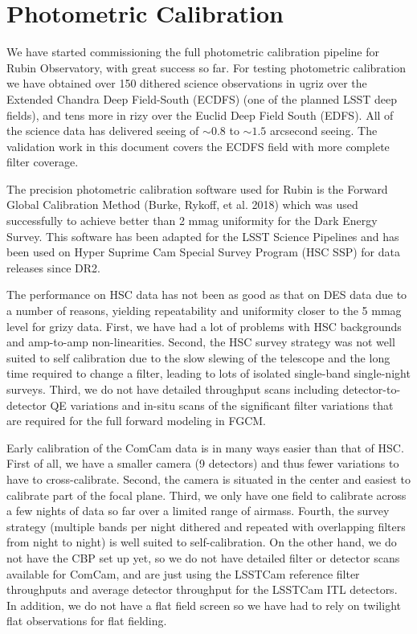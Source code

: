 \section{Photometric Calibration}
\label{sec:photometric_calibration}

We have started commissioning the full photometric calibration pipeline for
Rubin Observatory, with great success so far. For testing photometric
calibration we have obtained over 150 dithered science observations in ugriz
over the Extended Chandra Deep Field-South (ECDFS) (one of the planned LSST
deep fields), and tens more in rizy over the Euclid Deep Field South
(EDFS). All of the science data has delivered seeing of $\sim0.8$ to $\sim1.5$
arcsecond seeing.  The
validation work in this document covers the ECDFS field with more complete
filter coverage.

The precision photometric calibration software used for Rubin is the Forward
Global Calibration Method (Burke, Rykoff, et al. 2018) which was used
successfully to achieve better than 2 mmag uniformity for the Dark Energy
Survey. This software has been adapted for the LSST Science Pipelines and has
been used on Hyper Suprime Cam Special Survey Program (HSC SSP) for data
releases since DR2.

The performance on HSC data has not been as good as that on DES data due to a
number of reasons, yielding repeatability and uniformity closer to the 5 mmag
level for grizy data.  First, we have had a lot of problems with HSC
backgrounds and amp-to-amp non-linearities.  Second, the HSC survey strategy
was not well suited to self calibration due to the slow slewing of the
telescope and the long time required to change a filter, leading to lots of
isolated single-band single-night surveys.  Third, we do not have detailed
throughput scans including detector-to-detector QE variations and in-situ scans
of the significant filter variations that are required for the full forward
modeling in FGCM.

Early calibration of the ComCam data is in many ways easier than that of HSC.
First of all, we have a smaller camera (9 detectors) and thus fewer variations
to have to cross-calibrate.  Second, the camera is situated in the center and
easiest to calibrate part of the focal plane.  Third, we only have one field to
calibrate across a few nights of data so far over a limited range of airmass.
Fourth, the survey strategy (multiple bands per night dithered and repeated
with overlapping filters from night to night) is well suited to
self-calibration.  On the other hand, we do not have the CBP set up yet, so we
do not have detailed filter or detector scans available for ComCam, and are
just using the LSSTCam reference filter throughputs and average detector
throughput for the LSSTCam ITL detectors.  In addition, we do not have a flat
field screen so we have had to rely on twilight flat observations for flat fielding.

